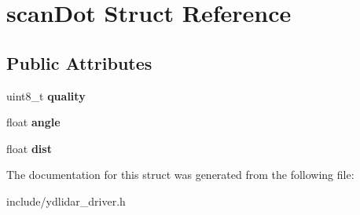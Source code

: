 \hypertarget{structscan_dot}{}\section{scan\+Dot Struct Reference}
\label{structscan_dot}
\subsection*{Public Attributes}
\begin{DoxyCompactItemize}
\item 
uint8\+\_\+t {\bfseries quality}\hypertarget{structscan_dot_ad4bb237b2544b87dd6d57a49b1168bc1}{}\label{structscan_dot_ad4bb237b2544b87dd6d57a49b1168bc1}

\item 
float {\bfseries angle}\hypertarget{structscan_dot_a97b573cb811b6ca7318c485a0c67e250}{}\label{structscan_dot_a97b573cb811b6ca7318c485a0c67e250}

\item 
float {\bfseries dist}\hypertarget{structscan_dot_af52fcb416f886a7f505c8baf6cabc87f}{}\label{structscan_dot_af52fcb416f886a7f505c8baf6cabc87f}

\end{DoxyCompactItemize}


The documentation for this struct was generated from the following file\+:\begin{DoxyCompactItemize}
\item 
include/ydlidar\+\_\+driver.\+h\end{DoxyCompactItemize}
